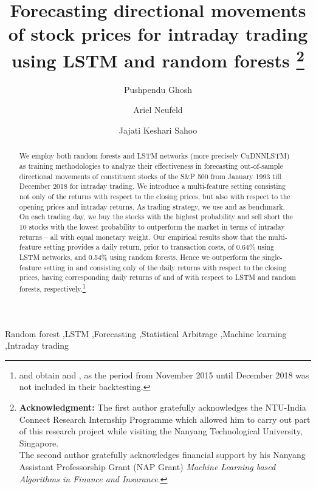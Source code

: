 \documentclass[review]{elsarticle}
\begin{document}
\begin{frontmatter}

\title{Forecasting directional movements of stock prices for intraday trading\\ using LSTM and random forests
	\footnote{
		\noindent
		\textbf{Acknowledgment:} The first author gratefully acknowledges the NTU-India Connect Research Internship Programme which allowed him to carry out part of this research project while visiting the Nanyang Technological University, Singapore.\\
		The second author gratefully acknowledges financial support by his Nanyang Assistant Professorship Grant (NAP Grant) \emph{Machine Learning based Algorithms in Finance and Insurance}.}
	}


\author[add1]{Pushpendu Ghosh}
\author[add2]{Ariel Neufeld}
\author[add3]{Jajati Keshari Sahoo}


\address[add1]{Department of Computer Science  Information Systems, BITS Pilani K.K.Birla Goa campus, India}
\address[add2]{Division of Mathematical Sciences, Nanyang Technological University, Singapore}
\address[add3]{Department of Mathematics, BITS Pilani K.K.Birla Goa campus, India}

\begin{abstract}
We employ both random forests  and LSTM networks (more precisely CuDNNLSTM)  as training methodologies to analyze their effectiveness in forecasting out-of-sample directional movements of constituent stocks of the S\&P 500 from January 1993 till December 2018 for intraday trading.
We introduce a multi-feature setting consisting not only of the returns with respect to the closing prices, but also with respect to the opening prices and intraday returns. 
As trading strategy, we use  \cite{krauss17} and \cite{krauss18} as benchmark. On each trading day, we buy the  stocks with the highest probability and sell short the 10 stocks with the lowest probability 
to outperform  the market in terms of intraday returns -- all with equal monetary weight. 
Our empirical results show that the multi-feature setting provides a daily return, prior to transaction costs, of 0.64\% using LSTM networks, and 0.54\% using random forests. Hence we outperform the single-feature setting in \cite{krauss18} and \cite{krauss17}
consisting only of 
the daily returns with respect to the closing prices, having corresponding daily returns of   and of  with respect to LSTM and random forests, respectively.\footnote{\cite{krauss18} and  \cite{krauss17} obtain  and , as the period from November 2015 until December 2018 was not included in their backtesting.}


	
\end{abstract}

\begin{keyword}
Random forest \sep LSTM  \sep Forecasting \sep Statistical Arbitrage \sep Machine learning \sep Intraday trading



\end{keyword}
\end{frontmatter}
\end{document}

